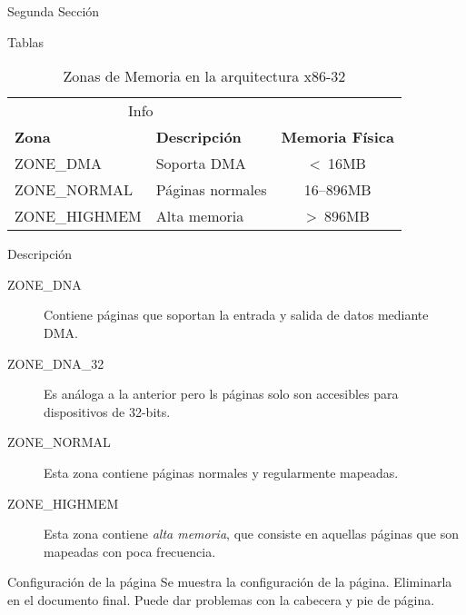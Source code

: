 \documentclass{article}
\begin{document}
\begin{section}{Segunda Sección}

\begin{subsection}{Tablas}

\lipsum[5]

\begin{table}[ht]
\caption{Zonas de Memoria en la arquitectura x86-32}
\kern 1mm                                  %
\centering \begin{tabular}{@{}llc@{}}
\toprule
\multicolumn{2}{c}{Info}                                            \\
\cmidrule(r){1-2}
\textbf{Zona} & \textbf{Descripción}   & \textbf{Memoria Física}    \\ 
\midrule
ZONE\_DMA     & Soporta DMA            & \textless \ 16MB           \\ 
ZONE\_NORMAL  & Páginas normales       & 16–896MB                   \\
ZONE\_HIGHMEM & Alta memoria           & \textgreater \ 896MB       \\ 
\bottomrule
\end{tabular}
\label{table:memoria-x86-32}
\end{table}

\end{subsection}

\begin{subsection}{Descripción}

\begin{description}
\item[ZONE\_DNA] Contiene páginas que soportan la entrada y salida de datos mediante DMA.
\item[ZONE\_DNA\_32] Es análoga a la anterior pero ls páginas solo son accesibles para
dispositivos de 32-bits.
\item[ZONE\_NORMAL] Esta zona contiene páginas normales y regularmente mapeadas.
\item[ZONE\_HIGHMEM] Esta zona contiene \textit{alta memoria}, que consiste en
 aquellas páginas que son mapeadas con poca frecuencia.
\end{description}

\end{subsection}

\pagebreak

\begin{subsection}{Configuración de la página}
Se muestra la configuración de la página. Eliminarla en el documento final. 
Puede dar problemas con la cabecera y pie de página.

\centering\layout
\end{subsection}

\end{section}
\end{document}
